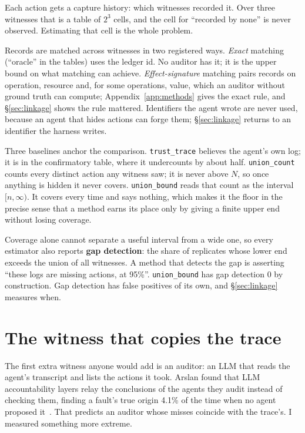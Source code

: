 \documentclass[11pt]{article}
\begin{document}
Each action gets a capture history: which witnesses recorded it. Over three
witnesses that is a table of $2^3$ cells, and the cell for ``recorded by none''
is never observed. Estimating that cell is the whole problem.

Records are matched across witnesses in two registered ways. \emph{Exact}
matching (``oracle'' in the tables) uses the ledger id. No auditor has it; it is
the upper bound on what matching can achieve. \emph{Effect-signature} matching
pairs records on operation, resource and, for some operations, value, which an
auditor without ground truth can compute; Appendix~\ref{app:methods} gives the
exact rule, and \S\ref{sec:linkage} shows the rule mattered. Identifiers the
agent wrote are never used, because an agent that hides actions can forge them;
\S\ref{sec:linkage} returns to an identifier the harness writes.

Three baselines anchor the comparison. \texttt{trust\_trace} believes the
agent's own log; it is in the confirmatory table, where it undercounts by about
half. \texttt{union\_count} counts every distinct action any witness
saw; it is never above $N$, so once anything is hidden it never covers.
\texttt{union\_bound} reads that count as the interval $[n, \infty)$. It covers
every time and says nothing, which makes it the floor in the precise sense that a
method earns its place only by giving a finite upper end without losing coverage.

Coverage alone cannot separate a useful interval from a wide one, so every
estimator also reports \textbf{gap detection}: the share of replicates whose lower
end exceeds the union of all witnesses. A method that detects the gap is asserting
``these logs are missing actions, at 95\%''. \texttt{union\_bound} has gap
detection 0 by construction. Gap detection has false positives of its own, and
\S\ref{sec:linkage} measures when.

\section{The witness that copies the trace}
\label{sec:auditor}

The first extra witness anyone would add is an auditor: an LLM that reads the
agent's transcript and lists the actions it took. Arslan found that LLM
accountability layers relay the conclusions of the agents they audit instead of
checking them, finding a fault's true origin 4.1\% of the time when no agent
proposed it~\citep{arslan2026audit}. That predicts an auditor whose misses
coincide with the trace's. I measured something more extreme.
\end{document}
